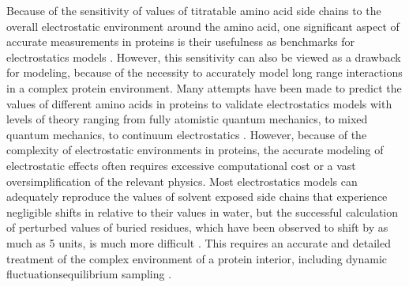 Because of the sensitivity of \pKa{} values of titratable amino acid side chains to the overall electrostatic environment around the amino acid, one significant aspect of accurate \pKa{} measurements in proteins is their usefulness as benchmarks for electrostatics models \cite{Gibas1996, Antosiewicz1996, Fogolari2002, Li2005, Olsson2011, Witham2011, Meyer2015, Mehler1999}.
However, this sensitivity can also be viewed as a drawback for modeling, because of the necessity to accurately model long range interactions in a complex protein environment. 
Many attempts have been made to predict the \pKa{} values of different amino acids in proteins to validate electrostatics models with levels of theory ranging from fully atomistic quantum mechanics, to mixed quantum mechanics, to continuum electrostatics \cite{Gibas1996, Antosiewicz1996, Schutz2001, Warshel2006, Nielsen2011}.
However, because of the complexity of electrostatic environments in proteins, the accurate modeling of electrostatic effects often requires excessive computational cost or a vast oversimplification of the relevant physics. 
Most electrostatics models can adequately reproduce the \pKa{} values of solvent exposed side chains that experience negligible shifts in \pKa{} relative to their values in water, but the successful calculation of perturbed \pKa{} values of buried residues, which have been observed to shift by as much as 5 \pKa{} units, is much more difficult \cite{Schutz2001, Simonson2001}.
This requires an accurate and detailed treatment of the complex environment of a protein interior, including dynamic fluctuationsequilibrium sampling \cite{Schutz2001, Nielsen2011, Warshel2011, Alexov2011, Li2013}.

